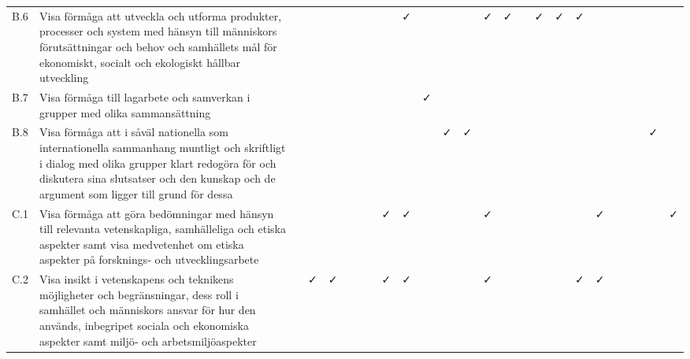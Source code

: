 \begin{sidewaystable}[H]
{\begin{tabular}{lp{16cm}ccccccccccccccccccccccc}
B.6 & Visa förmåga att utveckla och utforma produkter, processer och system med hänsyn till människors förutsättningar och behov och samhällets mål för ekonomiskt, socialt och ekologiskt hållbar utveckling                                                                                                             &          &          &          &          &          &          &          & \faCheck &          &          &          & \faCheck & \faCheck &          & \faCheck & \faCheck & \faCheck &          &          &          &          &          & \tabularnewline          
B.7 & Visa förmåga till lagarbete och samverkan i grupper med olika sammansättning                                                                                                                                                                                                                                        &          &          &          &          &          &          &          &          & \faCheck &          &          &          &          &          &          &          &          &          &          &          &          &          & \tabularnewline          
B.8 & Visa förmåga att i såväl nationella som internationella sammanhang muntligt och skriftligt i dialog med olika grupper klart redogöra för och diskutera sina slutsatser och den kunskap och de argument som ligger till grund för dessa                                                                              &          &          &          &          &          &          &          &          &          & \faCheck & \faCheck &          &          &          &          &          &          &          &          &          &          & \faCheck & \tabularnewline          
C.1 & Visa förmåga att göra bedömningar med hänsyn till relevanta vetenskapliga, samhälleliga och etiska aspekter samt visa medvetenhet om etiska aspekter på forsknings‐ och utvecklingsarbete                                                                                                                           &          &          &          &          &          &          & \faCheck & \faCheck &          &          &          & \faCheck &          &          &          &          &          & \faCheck &          &          &          &          & \faCheck \tabularnewline 
C.2 & Visa insikt i vetenskapens och teknikens möjligheter och begränsningar, dess roll i samhället och människors ansvar för hur den används, inbegripet sociala och ekonomiska aspekter samt miljö‐ och arbetsmiljöaspekter                                                                                             &          & \faCheck & \faCheck &          &          &          & \faCheck & \faCheck &          &          &          & \faCheck &          &          &          &          & \faCheck & \faCheck &          &          &          &          & \tabularnewline          

\end{tabular}}
\end{sidewaystable}
